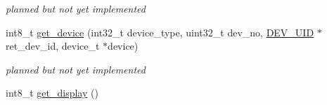 \begin{CompactItemize}
\begin{CompactList}\small\item\em planned but not yet implemented \item\end{CompactList}\item 
\hypertarget{group___r_e_s_o_u_r_c_e___m_g0c3d4aa0c760be1dd0ccf47f48959c6f}{
int8\_\-t \hyperlink{group___r_e_s_o_u_r_c_e___m_g0c3d4aa0c760be1dd0ccf47f48959c6f}{get\_\-device} (int32\_\-t device\_\-type, uint32\_\-t dev\_\-no, \hyperlink{group___d_e_v_i_c_e___a_p_i_g9f427f7fc1dc07b788af60c2aaa6b8d3}{DEV\_\-UID} $\ast$ret\_\-dev\_\-id, device\_\-t $\ast$device)}
\label{group___r_e_s_o_u_r_c_e___m_g0c3d4aa0c760be1dd0ccf47f48959c6f}

\begin{CompactList}\small\item\em planned but not yet implemented \item\end{CompactList}\item 
\hypertarget{group___r_e_s_o_u_r_c_e___m_g206e4e025a03eacca299aaef4a02f6ab}{
int8\_\-t \hyperlink{group___r_e_s_o_u_r_c_e___m_g206e4e025a03eacca299aaef4a02f6ab}{get\_\-display} ()}
\label{group___r_e_s_o_u_r_c_e___m_g206e4e025a03eacca299aaef4a02f6ab}


\end{CompactItemize}
